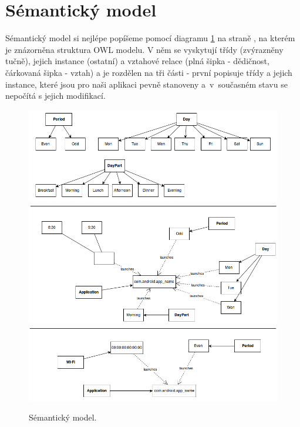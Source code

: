 \documentclass[thesis=M,czech]{FITthesis}[2012/06/26]
\begin{document}
\section{Sémantický model}\label{sec:semantic_model}
Sémantický model si nejlépe popíšeme pomocí diagramu \ref{fig:semantic} na straně \pageref{fig:semantic}, na kterém je znázorněna struktura OWL modelu. V něm se vyskytují třídy (zvýrazněny tučně), jejich instance (ostatní) a vztahové relace (plná šipka - dědičnost, čárkovaná šipka - vztah) a je rozdělen na tři části - první popisuje třídy a jejich instance, které jsou pro naši aplikaci pevně stanoveny a~v~současném stavu se nepočítá s jejich modifikací.

\begin{figure}\centering
	\includegraphics[width=1\textwidth]{figures/semantic1}
	\includegraphics[width=1\textwidth]{figures/semantic2}
	\includegraphics[width=1\textwidth]{figures/semantic3}
	\caption{Sémantický model.}
	\label{fig:semantic}
\end{figure}
\end{document}
